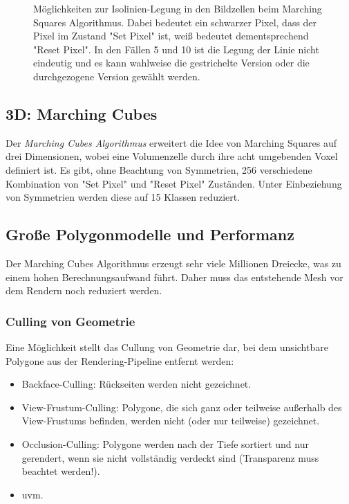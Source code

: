 \begin{figure}
					\caption{Möglichkeiten zur Isolinien-Legung in den Bildzellen beim Marching Squares Algorithmus. Dabei bedeutet ein schwarzer Pixel, dass der Pixel im Zustand "Set Pixel" ist, weiß bedeutet dementsprechend "Reset Pixel". In den Fällen \num{5} und \num{10} ist die Legung der Linie nicht eindeutig und es kann wahlweise die gestrichelte Version oder die durchgezogene Version gewählt werden.}
					\label{fig:marchingsquares}
				\end{figure}

			\subsection{3D: Marching Cubes}
				Der \emph{Marching Cubes Algorithmus} erweitert die Idee von Marching Squares auf drei Dimensionen, wobei eine Volumenzelle durch ihre acht umgebenden Voxel definiert ist. Es gibt, ohne Beachtung von Symmetrien, \num{256} verschiedene Kombination von "Set Pixel" und "Reset Pixel" Zuständen. Unter Einbeziehung von Symmetrien werden diese auf \num{15} Klassen reduziert.

			\subsection{Große Polygonmodelle und Performanz}
				Der Marching Cubes Algorithmus erzeugt sehr viele Millionen Dreiecke, was zu einem hohen Berechnungsaufwand führt. Daher muss das entstehende Mesh vor dem Rendern noch reduziert werden.

				\subsubsection{Culling von Geometrie}
					Eine Möglichkeit stellt das Cullung von Geometrie dar, bei dem unsichtbare Polygone aus der Rendering-Pipeline entfernt werden:
					\begin{itemize}
						\item Backface-Culling: Rückseiten werden nicht gezeichnet.
						\item View-Frustum-Culling: Polygone, die sich ganz oder teilweise außerhalb des View-Frustums befinden, werden nicht (oder nur teilweise) gezeichnet.
						\item Occlusion-Culling: Polygone werden nach der Tiefe sortiert und nur gerendert, wenn sie nicht vollständig verdeckt sind (Transparenz muss beachtet werden!).
						\item uvm.
					\end{itemize}

